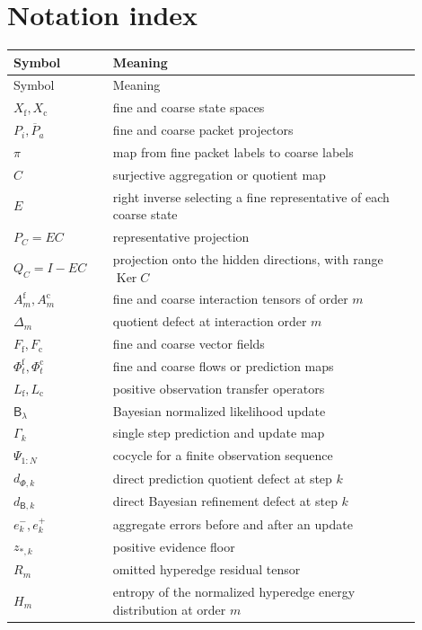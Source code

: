 \documentclass[11pt]{article}
\theoremstyle{definition}
\theoremstyle{remark}
\newcommand{\Ker}{\operatorname{Ker}}
\newcommand{\fine}{\mathrm f}
\newcommand{\coarse}{\mathrm c}
\newcommand{\Bup}{\mathsf B}
\begin{document}
\section{Notation index}\label{app:notation}
\begin{longtable}{@{}p{0.22\linewidth}p{0.68\linewidth}@{}}
\toprule
Symbol & Meaning\\
\midrule
\endfirsthead
\toprule
Symbol & Meaning\\
\midrule
\endhead
$X_{\fine},X_{\coarse}$ & fine and coarse state spaces\\
$P_i,\overline P_a$ & fine and coarse packet projectors\\
$\pi$ & map from fine packet labels to coarse labels\\
$C$ & surjective aggregation or quotient map\\
$E$ & right inverse selecting a fine representative of each coarse state\\
$P_C=EC$ & representative projection\\
$Q_C=I-EC$ & projection onto the hidden directions, with range $\Ker C$\\
$A_m^{\fine},A_m^{\coarse}$ & fine and coarse interaction tensors of order $m$\\
$\Delta_m$ & quotient defect at interaction order $m$\\
$F_{\fine},F_{\coarse}$ & fine and coarse vector fields\\
$\Phi_t^{\fine},\Phi_t^{\coarse}$ & fine and coarse flows or prediction maps\\
$L_{\fine},L_{\coarse}$ & positive observation transfer operators\\
$\Bup_{\lambda}$ & Bayesian normalized likelihood update\\
$\Gamma_k$ & single step prediction and update map\\
$\Psi_{1:N}$ & cocycle for a finite observation sequence\\
$d_{\Phi,k}$ & direct prediction quotient defect at step $k$\\
$d_{\Bup,k}$ & direct Bayesian refinement defect at step $k$\\
$e_k^-,e_k^+$ & aggregate errors before and after an update\\
$z_{*,k}$ & positive evidence floor\\
$R_m$ & omitted hyperedge residual tensor\\
$H_m$ & entropy of the normalized hyperedge energy distribution at order $m$\\
\bottomrule
\end{longtable}
\end{document}
